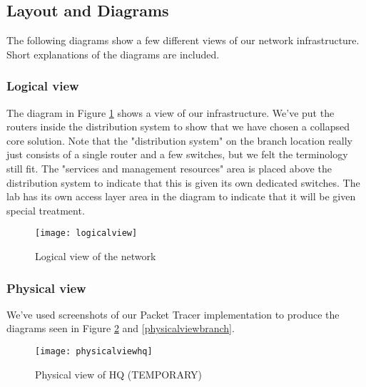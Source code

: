 


\subsection{Layout and Diagrams}

The following diagrams show a few different views of our network infrastructure. Short explanations of the diagrams are included.

\subsubsection{Logical view}


The diagram in Figure \ref{logicalview} shows a view of our infrastructure. We've put the routers inside the distribution system to show that we have chosen a collapsed core solution. Note that the "distribution system" on the branch location really just consists of a single router and a few switches, but we felt the terminology still fit. The "services and management resources" area is placed above the distribution system to indicate that this is given its own dedicated switches. The lab has its own access layer area in the diagram to indicate that it will be given special treatment.

\begin{figure}[H]
\caption{Logical view of the network}
\centering
\texttt{[image: logicalview]}
\label{logicalview}
\end{figure}

\subsubsection{Physical view}

We've used screenshots of our Packet Tracer implementation to produce the diagrams seen in Figure \ref{physicalviewhq} and \ref{physicalviewbranch}.


\begin{figure}[H]
\caption{Physical view of HQ (TEMPORARY)}
\centering
\texttt{[image: physicalviewhq]}
\label{physicalviewhq}
\end{figure}

